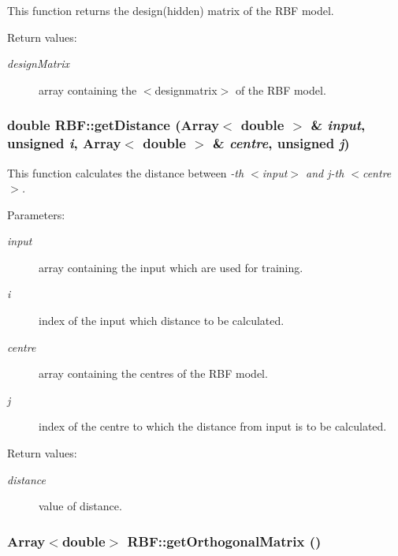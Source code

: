 This function returns the design(hidden) matrix of the RBF model. 

\begin{Desc}
\item[Return values:]
\begin{description}
\item[{\em design\-Matrix}]array containing the $<$designmatrix$>$ of the RBF model.\end{description}
\end{Desc}
\subsubsection{\setlength{\rightskip}{0pt plus 5cm}double RBF::get\-Distance (Array$<$ double $>$ \& {\em input}, unsigned {\em i}, Array$<$ double $>$ \& {\em centre}, unsigned {\em j})\hspace{0.3cm}{\tt  [static]}}\label{classRBF_e0}


This function calculates the distance between {\em -th $<$input$>$ and j-th $<$centre$>$. \/}

\begin{Desc}
\item[Parameters:]
\begin{description}
\item[{\em input}]array containing the input which are used for training. \item[{\em i}]index of the input which distance to be calculated. \item[{\em centre}]array containing the centres of the RBF model. \item[{\em j}]index of the centre to which the distance from input is to be calculated. \end{description}
\end{Desc}
\begin{Desc}
\item[Return values:]
\begin{description}
\item[{\em distance}]value of distance.\end{description}
\end{Desc}
\subsubsection{\setlength{\rightskip}{0pt plus 5cm}Array$<$double$>$ RBF::get\-Orthogonal\-Matrix ()}\label{classRBF_a19}


